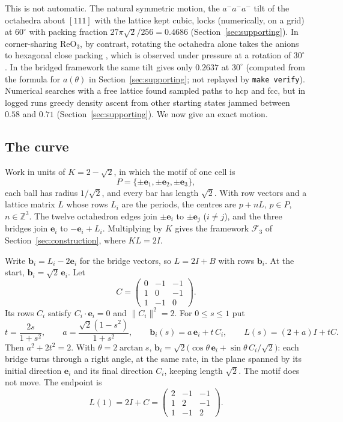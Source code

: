 \documentclass[11pt]{amsart}
\theoremstyle{definition}
\theoremstyle{remark}
\newcommand{\Z}{\mathbb{Z}}
\newcommand{\e}{\mathbf{e}}
\newcommand{\vb}{\mathbf{b}}
\newcommand{\norm}[1]{\lVert#1\rVert}
\begin{document}
This is not automatic. The natural symmetric motion, the $a^-a^-a^-$ tilt of the octahedra about $[111]$ \cite{Glazer1972} with the lattice kept cubic, locks (numerically, on a grid) at $60^\circ$ with packing fraction $27\pi\sqrt2/256=0.4686$ (Section~\ref{sec:supporting}). In corner-sharing ReO$_3$, by contrast, rotating the octahedra alone takes the anions to hexagonal close packing \cite{OKeeffeHyde1977,JohnssonLemmens2007}, which is observed under pressure at a rotation of $30^\circ$ \cite{Shan2026}. In the bridged framework the same tilt gives only $0.2637$ at $30^\circ$ (computed from the formula for $a(\theta)$ in Section~\ref{sec:supporting}; not replayed by \texttt{make verify}). Numerical searches with a free lattice found sampled paths to hcp and fcc, but in logged runs greedy density ascent from other starting states jammed between $0.58$ and $0.71$ (Section~\ref{sec:supporting}). We now give an exact motion.

\subsection{The curve}
Work in units of $K=2-\sqrt2$, in which the motif of one cell is
\[
P=\{\pm\e_1,\pm\e_2,\pm\e_3\},
\]
each ball has radius $1/\sqrt2$, and every bar has length $\sqrt2$. With row vectors and a lattice matrix $L$ whose rows $L_i$ are the periods, the centres are $p+nL$, $p\in P$, $n\in\Z^3$. The twelve octahedron edges join $\pm\e_i$ to $\pm\e_j$ ($i\ne j$), and the three bridges join $\e_i$ to $-\e_i+L_i$. Multiplying by $K$ gives the framework $\mathcal F_3$ of Section~\ref{sec:construction}, where $KL=2I$.

Write $\vb_i=L_i-2\e_i$ for the bridge vectors, so $L=2I+B$ with rows $\vb_i$. At the start, $\vb_i=\sqrt2\,\e_i$. Let
\[
C=\begin{pmatrix}0&-1&-1\\1&0&-1\\1&-1&0\end{pmatrix}.
\]
Its rows $C_i$ satisfy $C_i\cdot\e_i=0$ and $\norm{C_i}^2=2$. For $0\le s\le1$ put
\begin{equation}\label{eq:curve}
t=\frac{2s}{1+s^2},\qquad a=\frac{\sqrt2(1-s^2)}{1+s^2},\qquad \vb_i(s)=a\,\e_i+t\,C_i,\qquad L(s)=(2+a)I+tC .
\end{equation}
Then $a^2+2t^2=2$. With $\theta=2\arctan s$, $\vb_i=\sqrt2\bigl(\cos\theta\,\e_i+\sin\theta\,C_i/\sqrt2\bigr)$: each bridge turns through a right angle, at the same rate, in the plane spanned by its initial direction $\e_i$ and its final direction $C_i$, keeping length $\sqrt2$. The motif does not move. The endpoint is
\[
L(1)=2I+C=\begin{pmatrix}2&-1&-1\\1&2&-1\\1&-1&2\end{pmatrix}.
\]
\end{document}
